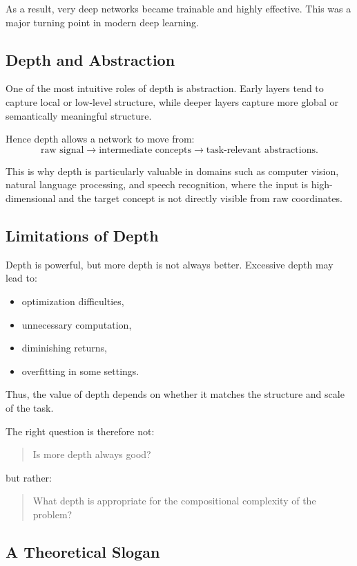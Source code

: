 As a result, very deep networks became trainable and highly effective. This was a major turning point in modern deep learning.

\subsection{Depth and Abstraction}

One of the most intuitive roles of depth is abstraction. Early layers tend to capture local or low-level structure, while deeper layers capture more global or semantically meaningful structure.

Hence depth allows a network to move from:
\[
\text{raw signal} \longrightarrow \text{intermediate concepts} \longrightarrow \text{task-relevant abstractions}.
\]

This is why depth is particularly valuable in domains such as computer vision, natural language processing, and speech recognition, where the input is high-dimensional and the target concept is not directly visible from raw coordinates.

\subsection{Limitations of Depth}

Depth is powerful, but more depth is not always better. Excessive depth may lead to:
\begin{itemize}
    \item optimization difficulties,
    \item unnecessary computation,
    \item diminishing returns,
    \item overfitting in some settings.
\end{itemize}

Thus, the value of depth depends on whether it matches the structure and scale of the task.

The right question is therefore not:
\begin{quote}
Is more depth always good?
\end{quote}
but rather:
\begin{quote}
What depth is appropriate for the compositional complexity of the problem?
\end{quote}

\subsection{A Theoretical Slogan}

